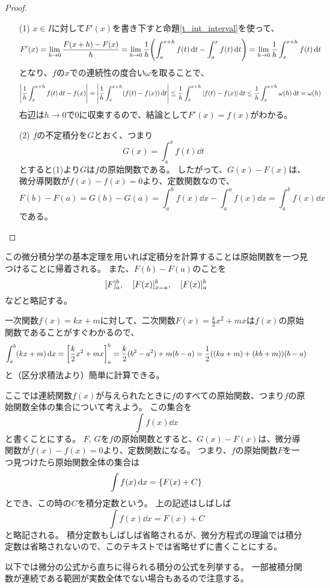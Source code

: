 \begin{proof}
\begin{itemize}
\item[(1)]
$x \in I$に対して$F'(x)$を書き下すと命題\ref{t_int_interval}を使って、
$$
F'(x)
= \lim_{h \to 0}\frac{F(x+h)-F(x)}{h}
= \lim_{h \to 0}\frac{1}{h}\qty(\int_a^{x+h} f(t)\dd{t}-\int_a^x f(t)\dd{t})
= \lim_{h \to 0}\frac{1}{h}\int_x^{x+h} f(t)\dd{t}
$$
となり、$f$の$x$での連続性の度合い$\omega$を取ることで、
$$
\abs{\frac{1}{h}\int_x^{x+h} f(t)\dd{t}-f(x)}
= \abs{\frac{1}{h}\int_x^{x+h} (f(t)-f(x))\dd{t}}
\le \frac{1}{h}\int_x^{x+h} \abs{f(t)-f(x)}\dd{t}
\le \frac{1}{h}\int_x^{x+h} \omega(h)\dd{t}
= \omega(h)
$$
右辺は$h \to 0$で$0$に収束するので、結論として$F'(x) = f(x)$がわかる。
\item[(2)]
$f$の不定積分を$G$とおく、つまり
$$
G(x) = \int_a^x f(t)\dd{t}
$$
とすると(1)より$G$は$f$の原始関数である。
したがって、$G(x)-F(x)$は、微分導関数が$f(x)-f(x) = 0$より、定数関数なので、
$$
F(b)-F(a) = G(b)-G(a) = \int_a^b f(x)\dd{x}-\int_a^a f(x)\dd{x} = \int_a^b f(x)\dd{x}
$$
である。
\end{itemize}
\end{proof}

この微分積分学の基本定理を用いれば定積分を計算することは原始関数を一つ見つけることに帰着される。
また、$F(b)-F(a)$のことを
$$
\lreval{F}_a^b, \quad \lreval{F(x)}_{x = a}^b, \quad \lreval{F(x)}_a^b
$$
などと略記する。

\begin{example}
一次関数$f(x) = k x+m$に対して、二次関数$F(x) = \frac{k}{2}x^2+m x$は$f(x)$の原始関数であることがすぐわかるので、
$$
\int_a^b (k x+m)\dd{x} = \lreval*{\frac{k}{2}x^2+m x}_a^b = \frac{k}{2}(b^2-a^2)+m(b-a) = \frac{1}{2}((k a+m)+(k b+m))(b-a)
$$
と（区分求積法より）簡単に計算できる。
\end{example}

ここでは連続関数$f(x)$が与えられたときに$fの$すべての原始関数、つまり$f$の原始関数全体の集合について考えよう。
この集合を
$$
\int f(x)\dd{x}
$$
と書くことにする。
$F$, $G$を$f$の原始関数とすると、$G(x)-F(x)$は、微分導関数が$f(x)-f(x) = 0$より、定数関数になる。
つまり、$f$の原始関数$F$を一つ見つけたら原始関数全体の集合は
$$
\int f(x)\dd{x} = \lrset{ F(x)+C }
$$
とでき、この時の$C$を積分定数という。
上の記述はしばしば
$$
\int f(x)\dd{x} = F(x)+C
$$
と略記される。
積分定数もしばしば省略されるが、微分方程式の理論では積分定数は省略されないので、このテキストでは省略せずに書くことにする。

以下では微分の公式から直ちに得られる積分の公式を列挙する。
一部被積分関数が連続である範囲が実数全体でない場合もあるので注意する。

